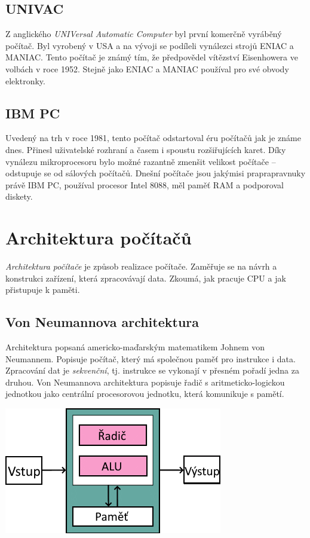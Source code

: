 \documentclass[a4paper]{article}
\begin{document}
    \subsection{UNIVAC}
        Z anglického \textit{UNIVersal Automatic Computer} byl první komerčně vyráběný počítač. Byl vyrobený v USA a na vývoji se podíleli vynálezci strojů ENIAC a MANIAC. Tento počítač je známý tím, že předpovědel vítězství Eisenhowera ve volbách v roce 1952. Stejně jako ENIAC a MANIAC používal pro své obvody elektronky.
    \subsection{IBM PC}
        Uvedený na trh v roce 1981, tento počítač odstartoval éru počítačů jak je známe dnes. Přinesl uživatelské rozhraní a časem i spoustu rozšiřujících karet. Díky vynálezu mikroprocesoru bylo možné razantně zmenšit velikost počítače -- odstupuje se od sálových počítačů. Dnešní počítače jsou jakýmisi praprapravnuky právě IBM PC, používal procesor Intel 8088, měl paměť RAM a podporoval diskety.

\newpage


\section{Architektura počítačů}
    \textit{Architektura počítače} je způsob realizace počítače. Zaměřuje se na návrh a konstrukci zařízení, která zpracovávají data. Zkoumá, jak pracuje CPU a jak přistupuje k paměti.
    \subsection{Von Neumannova architektura}
        Architektura popsaná americko-maďarským matematikem Johnem von Neumannem. Popisuje počítač, který má společnou paměť pro instrukce i data. Zpracování dat je \textit{sekvenční}, tj. instrukce se vykonají v přesném pořadí jedna za druhou. Von Neumannova architektura  popisuje řadič s aritmeticko-logickou jednotkou jako centrální procesorovou jednotku, která komunikuje s pamětí. \par
        \includegraphics{vonNeumann.png}\par
\end{document}
